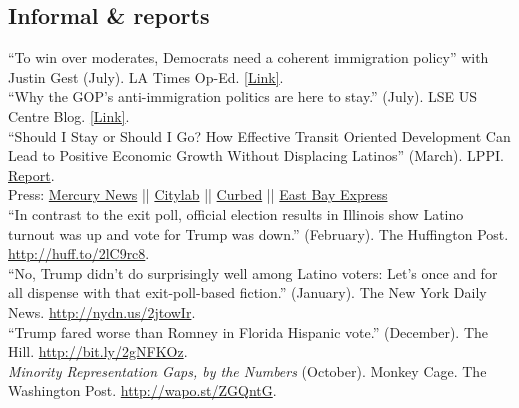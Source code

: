 \documentclass[11pt, a4paper]{article}
\newcommand{\years}[1]{\marginnote{\scriptsize #1}}
\begin{document}
\subsection*{Informal \& reports}
\years{2018} ``To win over moderates, Democrats need a coherent immigration policy'' with Justin Gest (July). LA Times Op-Ed. \href{http://www.latimes.com/opinion/op-ed/la-oe-gest-reny-immigration-policy-democrats-20180720-story.html}{[Link]}.\\
\years{} ``Why the GOP’s anti-immigration politics are here to stay.'' (July). LSE US Centre Blog. \href{http://blogs.lse.ac.uk/usappblog/2018/07/09/why-the-gops-anti-immigration-politics-are-here-to-stay/}{[Link]}.\\
\years{} ``Should I Stay or Should I Go? How Effective Transit Oriented Development Can Lead to Positive Economic Growth Without Displacing Latinos'' (March). LPPI. \href{http://latino.ucla.edu/}{Report}.\\
\indent Press: 
\indent \href{https://www.mercurynews.com/2018/03/29/development-without-gentrification-oaklands-fruitvale-is-the-model-report-says/}{Mercury News} || 
\indent \href{https://www.citylab.com/equity/2018/04/how-transit-oriented-development-can-prevent-displacement/556373/?utm_source=twb%3Futm_source%3Dfbb}{Citylab} || 
\indent \href{https://sf.curbed.com/2018/4/4/17198326/oakland-fruitvale-transit-village-housing-displacement-gentrification}{Curbed} || 
\indent \href{https://www.eastbayexpress.com/SevenDays/archives/2018/04/02/mondays-briefing-ucla-study-says-fruitvale-village-is-a-model-for-urban-planning-stephon-clark-protestor-struck-by-sacramento-sheriffs-veh}{East Bay Express}\\
\years{2017} ``In contrast to the exit poll, official election results in Illinois show Latino turnout was up and vote for Trump was down.'' (February). The Huffington Post. \href{http://huff.to/2lC9rc8}{http://huff.to/2lC9rc8}.\\
\years{} ``No, Trump didn't do surprisingly well among Latino voters: Let's once and for all dispense with that exit-poll-based fiction.'' (January). The New York Daily News. \href{http://nydn.us/2jtowIr}{http://nydn.us/2jtowIr}.\\
\years{2016} ``Trump fared worse than Romney in Florida Hispanic vote.'' (December). The Hill. \href{http://bit.ly/2gNFKOz}{http://bit.ly/2gNFKOz}.\\
\years{2014}\textit{Minority Representation Gaps, by the Numbers} (October). Monkey Cage. The Washington Post. \href{http://wapo.st/ZGQntG}{http://wapo.st/ZGQntG}.\\
\end{document}

